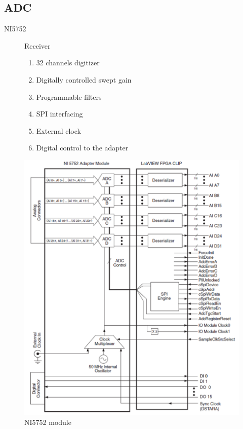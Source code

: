 \documentclass[t,12pt,english
\ifx\beamermode\undefined\else,\beamermode\fi
]{beamer}
\begin{document}
\subsection{ADC}
\begin{frame}{NI5752}



\begin{figure}[!htb]

\begin{block}{\footnotesize{Receiver}}\footnotesize{}
\begin{enumerate} 
\vspace{0.05cm}
     \item \footnotesize{32 channels digitizer}
     \item \footnotesize{Digitally controlled swept gain}
     \item \footnotesize{Programmable filters}
     \item \footnotesize{SPI interfacing}
     \item \footnotesize{External clock}
     \item \footnotesize{Digital control to the adapter}
\end{enumerate}
\end{block}

\endminipage
{}
\centering
\includegraphics[width=.95\textwidth]{8.png}
\caption{\tiny{NI5752 module}}
\endminipage
\end{figure}
\end{frame}
\end{document}
